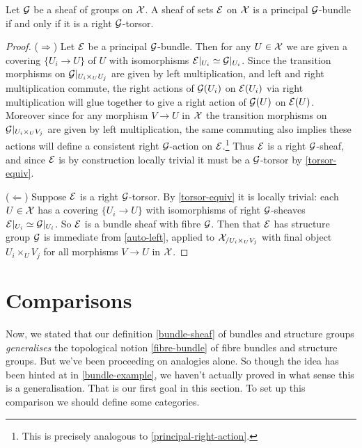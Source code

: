 \begin{proposition}
  \label{principal-equals-torsor}
  Let $\mathcal{G}$ be a sheaf of groups on $\mathcal{X}$. A sheaf of sets $\mathcal{E}$ on $\mathcal{X}$
  is a principal $\mathcal{G}$-bundle if and only if it is a right $\mathcal{G}$-torsor.
\end{proposition}

\begin{proof}
  ($\Rightarrow$) Let $\mathcal{E}$ be a principal $\mathcal{G}$-bundle. Then for any $U
  \in \mathcal{X}$ we are given a covering $\{U_i \to U\}$ of $U$ with
  isomorphisms $\mathcal{E}|_{U_i} \simeq \mathcal{G}|_{U_i}$. Since the transition
  morphisms on $\mathcal{G}|_{U_i \times_U U_j}$ are given by left
  multiplication, and left and right multiplication commute, the right
  actions of $\mathcal{G}(U_i)$ on $\mathcal{E}(U_i)$ via right multiplication will glue
  together to give a right action of $\mathcal{G}(U)$ on $\mathcal{E}(U)$. Moreover
  since for any morphism $V \to U$ in $\mathcal{X}$ the transition morphisms on
  $\mathcal{G}|_{U_i \times_U V_j}$ are given by left multiplication, the same
  commuting also implies these actions will define a consistent right
  $\mathcal{G}$-action on $\mathcal{E}$.\footnote{This is precisely analogous to
    \cref{principal-right-action}.} Thus $\mathcal{E}$ is a right $\mathcal{G}$-sheaf,
  and since $\mathcal{E}$ is by construction locally trivial it must be a
  $\mathcal{G}$-torsor by \cref{torsor-equiv}.

  ($\Leftarrow$) Suppose $\mathcal{E}$ is a right $\mathcal{G}$-torsor. By
  \cref{torsor-equiv} it is locally trivial: each $U \in \mathcal{X}$ has a
  covering $\{U_i \to U\}$ with isomorphisms of right $\mathcal{G}$-sheaves
  $\mathcal{E}|_{U_i} \simeq \mathcal{G}|_{U_i}$. So $\mathcal{E}$ is a bundle sheaf with fibre
  $\mathcal{G}$. Then that $\mathcal{E}$ has structure group $\mathcal{G}$ is immediate from
  \cref{auto-left}, applied to $\mathcal{X}_{/U_i \times_U V_j}$ with final
  object $U_i \times_U V_j$ for all morphisms $V \to U$ in $\mathcal{X}$.
\end{proof}


\section{Comparisons}

Now, we stated that our definition \cref{bundle-sheaf} of bundles and
structure groups \emph{generalises} the topological notion
\cref{fibre-bundle} of fibre bundles and structure groups. But we've
been proceeding on analogies alone. So though the idea has been hinted
at in \cref{bundle-example}, we haven't actually proved in what sense
this is a generalisation. That is our first goal in this section. To
set up this comparison we should define some categories.

